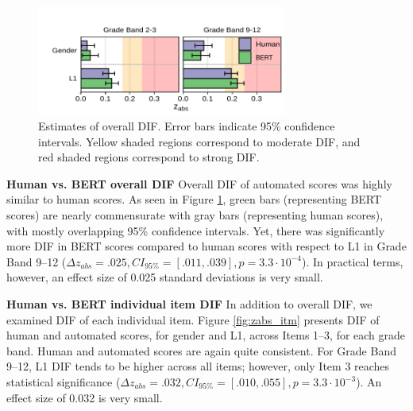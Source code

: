 \documentclass [PhD] {uclathes}
\begin{document}
\begin{figure}[h]
    \centering
    \hspace{-.6cm}
    \includegraphics[width=8.2cm]{figures/20230422_ETS-DIF_zabs_ovr_edit.pdf}
    \caption{Estimates of overall DIF. Error bars indicate 95\% confidence intervals. Yellow shaded regions correspond to moderate DIF, and red shaded regions correspond to strong DIF.}
    \label{fig:zabs_ovr}
\end{figure}

\noindent \textbf{Human vs. BERT overall DIF} \;
Overall DIF of automated scores was highly similar to human scores. As seen in Figure \ref{fig:zabs_ovr}, green bars (representing BERT scores) are nearly commensurate with gray bars (representing human scores), with mostly overlapping 95\% confidence intervals. Yet, there was significantly more DIF in BERT scores compared to human scores with respect to L1 in Grade Band 9–12 ($\Delta z_{abs} = .025, CI_{95\%} = [.011, .039], p = 3.3 \cdot 10^{-4}$). In practical terms, however, an effect size of 0.025 standard deviations is very small. 

\noindent \textbf{Human vs. BERT individual item DIF} \;
In addition to overall DIF, we examined DIF of each individual item. Figure \ref{fig:zabs_itm} presents DIF of human and automated scores, for gender and L1, across Items 1–3, for each grade band. Human and automated scores are again quite consistent. For Grade Band 9–12, L1 DIF tends to be higher across all items; however, only Item 3 reaches statistical significance ($\Delta z_{abs} = .032, CI_{95\%} = [.010, .055], p = 3.3 \cdot 10^{-3}$). An effect size of 0.032 is very small.
\end{document}
